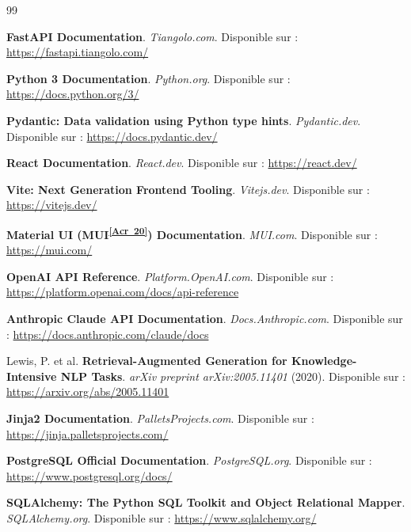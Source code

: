 \documentclass[12pt, a4paper]{report}
\newcommand{\acref}[1]{\textsuperscript{\hyperlink{acr:#1}{[Acr~#1]}}}
\begin{document}
\begin{thebibliography}{99}

\textbf{FastAPI Documentation}. 
\textit{Tiangolo.com}. Disponible sur : \url{https://fastapi.tiangolo.com/}

\textbf{Python 3 Documentation}. 
\textit{Python.org}. Disponible sur : \url{https://docs.python.org/3/}

\textbf{Pydantic: Data validation using Python type hints}. 
\textit{Pydantic.dev}. Disponible sur : \url{https://docs.pydantic.dev/}

\textbf{React Documentation}. 
\textit{React.dev}. Disponible sur : \url{https://react.dev/}

\textbf{Vite: Next Generation Frontend Tooling}. 
\textit{Vitejs.dev}. Disponible sur : \url{https://vitejs.dev/}

\textbf{Material UI (MUI\acref{20}) Documentation}. 
\textit{MUI.com}. Disponible sur : \url{https://mui.com/}

\textbf{OpenAI API Reference}. 
\textit{Platform.OpenAI.com}. Disponible sur : \url{https://platform.openai.com/docs/api-reference}

\textbf{Anthropic Claude API Documentation}. 
\textit{Docs.Anthropic.com}. Disponible sur : \url{https://docs.anthropic.com/claude/docs}

Lewis, P. et al. \textbf{Retrieval-Augmented Generation for Knowledge-Intensive NLP Tasks}. 
\textit{arXiv preprint arXiv:2005.11401} (2020). Disponible sur : \url{https://arxiv.org/abs/2005.11401}

\textbf{Jinja2 Documentation}. 
\textit{PalletsProjects.com}. Disponible sur : \url{https://jinja.palletsprojects.com/}

\textbf{PostgreSQL Official Documentation}. 
\textit{PostgreSQL.org}. Disponible sur : \url{https://www.postgresql.org/docs/}

\textbf{SQLAlchemy: The Python SQL Toolkit and Object Relational Mapper}. 
\textit{SQLAlchemy.org}. Disponible sur : \url{https://www.sqlalchemy.org/}


\end{thebibliography}
\end{document}
